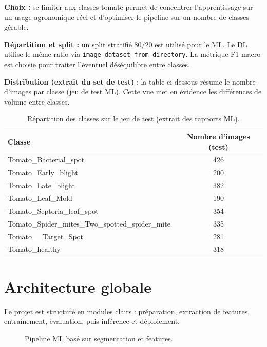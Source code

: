 \documentclass[12pt,a4paper]{article}
\begin{document}
\textbf{Choix :} se limiter aux classes tomate permet de concentrer l'apprentissage sur un usage agronomique r\'eel et d'optimiser le pipeline sur un nombre de classes g\'erable.

\textbf{R\'epartition et split :} un split stratifi\'e 80/20 est utilis\'e pour le ML. Le DL utilise le m\^eme ratio via \texttt{image\_dataset\_from\_directory}. La m\'etrique F1 macro est choisie pour traiter l'\'eventuel d\'es\'equilibre entre classes.

\textbf{Distribution (extrait du set de test)} : la table ci-dessous r\'esume le nombre d'images par classe (jeu de test ML). Cette vue met en \'evidence les diff\'erences de volume entre classes.

\begin{table}[H]
\centering
\begin{tabular}{lc}
\toprule
Classe & Nombre d'images (test) \\
\midrule
Tomato\_Bacterial\_spot & 426 \\
Tomato\_Early\_blight & 200 \\
Tomato\_Late\_blight & 382 \\
Tomato\_Leaf\_Mold & 190 \\
Tomato\_Septoria\_leaf\_spot & 354 \\
Tomato\_Spider\_mites\_Two\_spotted\_spider\_mite & 335 \\
Tomato\_\_Target\_Spot & 281 \\
Tomato\_healthy & 318 \\
\bottomrule
\end{tabular}
\caption{R\'epartition des classes sur le jeu de test (extrait des rapports ML).}
\end{table}

\section{Architecture globale}
Le projet est structur\'e en modules clairs : pr\'eparation, extraction de features, entra\^inement, \`evaluation, puis inf\'erence et d\'eploiement.

\begin{figure}[h!]
\centering
{}
\caption{Pipeline ML bas\'e sur segmentation et features.}
\end{figure}
\end{document}
